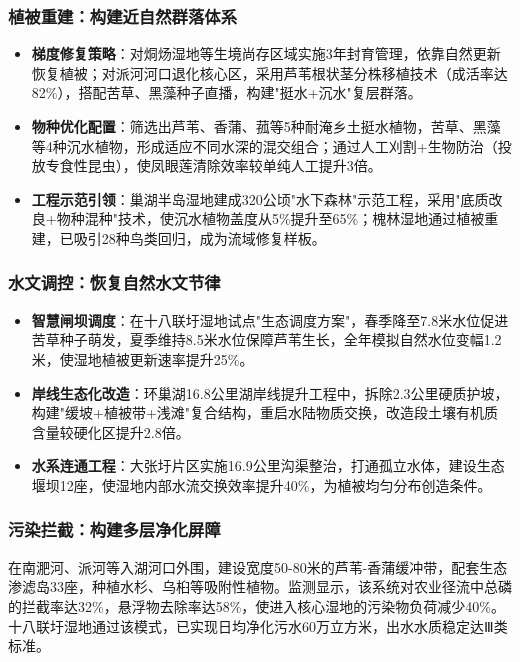 \subsubsection{植被重建：构建近自然群落体系}
\begin{itemize}
    \item \textbf{梯度修复策略}：对烔炀湿地等生境尚存区域实施3年封育管理，依靠自然更新恢复植被；对派河河口退化核心区，采用芦苇根状茎分株移植技术（成活率达82\%），搭配苦草、黑藻种子直播，构建"挺水+沉水"复层群落。

    \item \textbf{物种优化配置}：筛选出芦苇、香蒲、菰等5种耐淹乡土挺水植物，苦草、黑藻等4种沉水植物，形成适应不同水深的混交组合；通过人工刈割+生物防治（投放专食性昆虫），使凤眼莲清除效率较单纯人工提升3倍。

    \item \textbf{工程示范引领}：巢湖半岛湿地建成320公顷"水下森林"示范工程，采用"底质改良+物种混种"技术，使沉水植物盖度从5\%提升至65\%；槐林湿地通过植被重建，已吸引28种鸟类回归，成为流域修复样板。
\end{itemize}

\subsubsection{水文调控：恢复自然水文节律}
\begin{itemize}
    \item \textbf{智慧闸坝调度}：在十八联圩湿地试点"生态调度方案"，春季降至7.8米水位促进苦草种子萌发，夏季维持8.5米水位保障芦苇生长，全年模拟自然水位变幅1.2米，使湿地植被更新速率提升25\%。

    \item \textbf{岸线生态化改造}：环巢湖16.8公里湖岸线提升工程中，拆除2.3公里硬质护坡，构建"缓坡+植被带+浅滩"复合结构，重启水陆物质交换，改造段土壤有机质含量较硬化区提升2.8倍。

    \item \textbf{水系连通工程}：大张圩片区实施16.9公里沟渠整治，打通孤立水体，建设生态堰坝12座，使湿地内部水流交换效率提升40\%，为植被均匀分布创造条件。
\end{itemize}

\subsubsection{污染拦截：构建多层净化屏障}
在南淝河、派河等入湖河口外围，建设宽度50-80米的芦苇-香蒲缓冲带，配套生态渗滤岛33座，种植水杉、乌桕等吸附性植物。监测显示，该系统对农业径流中总磷的拦截率达32\%，悬浮物去除率达58\%，使进入核心湿地的污染物负荷减少40\%。十八联圩湿地通过该模式，已实现日均净化污水60万立方米，出水水质稳定达Ⅲ类标准。

